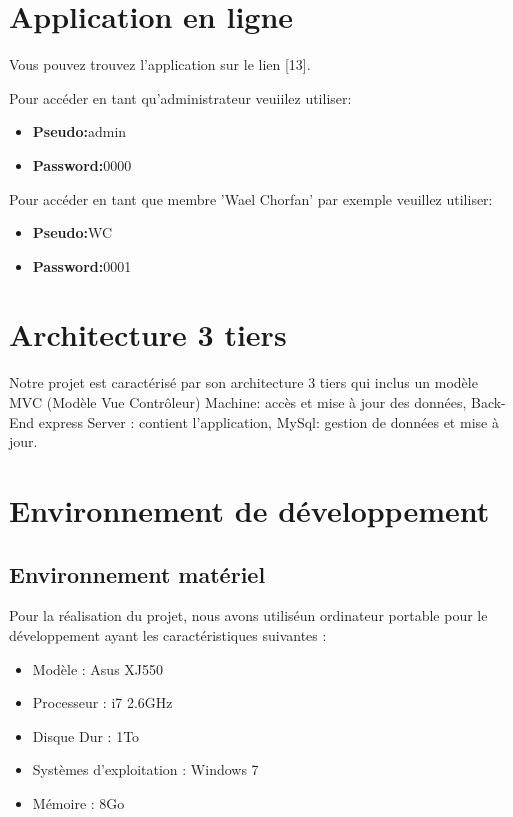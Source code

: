 \section{Application en ligne}
Vous pouvez trouvez l'application sur le lien [13].


  Pour acc\'{e}der en tant qu'administrateur veuiilez utiliser:

  \begin{itemize}
    \item {\textbf{ Pseudo:}admin}
    \item {\textbf{ Password:}0000}
  \end{itemize}


  Pour acc\'{e}der en tant que membre 'Wael Chorfan' par exemple veuillez utiliser:

  \begin{itemize}
    \item {\textbf{ Pseudo:}WC}
    \item {\textbf{ Password:}0001}
  \end{itemize}

 \newpage



 \section{ Architecture 3 tiers}

Notre projet est caract\'{e}ris\'{e} par son architecture 3 tiers qui inclus un mod\`{e}le MVC (Mod\`{e}le
Vue Contr\^{o}leur)
\textbullet{} Machine: acc\`{e}s et mise \`{a} jour des donn\'{e}es,
\textbullet{} Back-End express Server : contient l'application,
\textbullet{} MySql: gestion de donn\'{e}es et mise \`{a} jour.


\section{Environnement de d\'{e}veloppement}

  \subsection{Environnement mat\'{e}riel }

  Pour la r\'{e}alisation du projet, nous avons utilis\'{e}un ordinateur
  portable pour le d\'{e}veloppement ayant les caract\'{e}ristiques suivantes :

\begin{itemize}
  \item {  Mod\`{e}le : Asus XJ550 }
  \item {Processeur : i7 2.6GHz }
  \item {Disque Dur : 1To }
  \item { Syst\`{e}mes d'exploitation : Windows 7  }
  \item {M\'{e}moire : 8Go}
  
\end{itemize}





